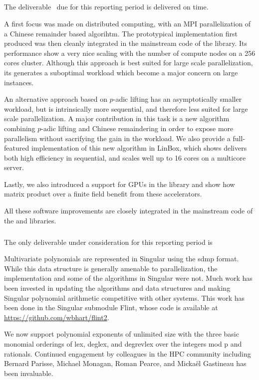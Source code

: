 \subparagraph{}
  \label{hpc@hpc-linbox}

The deliverable~ due for this reporting period is
delivered on time.

A first focus was made on distributed computing, with an MPI parallelization of a Chinese remainder based
algorihtm. The prototypical implementation first produced was then cleanly integrated in the mainstream code of the
library. Its performance show a very nice scaling with the number of compute nodes on a 256 cores cluster. Although this
approach is best suited for large scale parallelization, its generates a suboptimal workload which become a major
concern on large instances.

An alternative approach based on $p$-adic lifting has an  asymptotically smaller workload, but is intrinsically more
sequential, and therefore less suited for large scale parallelization. 
A major contribution in this task is a new algorithm combining $p$-adic lifting and Chinese remaindering in order to
expose more parallelism without sacrifying the gain in the workload.
We also provide a full-featured  implementation of this new algorithm in LinBox, which shows delivers both high
efficiency in sequential, and scales well up to 16 cores on a multicore server.

Lastly, we also introduced a support for GPUs in the \fflasffpack library and show how matrix product over a finite
field benefit from these accelerators.

All these software improvements are closely integrated in the mainstream code of the \fflasffpack and \LinBox libraries.

  \subparagraph{}
  \label{hpc@hpc-singular}

  The only deliverable under consideration for this reporting period
  is~

Multivariate polynomials are represented in Singular using the sdmp format. While this data structure is generally amenable to parallelization, the implementation and some of the algorithms in Singular were not. Much work has been invested in updating the algorithms and data structures and making Singular polynomial arithmetic competitive with other systems. This work has been done in the Singular submodule Flint, whose code is available at \url{https://github.com/wbhart/flint2}.

We now support polynomial exponents of unlimited size with the three basic monomial orderings of lex, deglex, and degrevlex over the integers mod p and rationals. Continued engagement by colleagues in the HPC community including Bernard Parisse, Michael Monagan, Roman Pearce, and Micka\"el Gastineau has been invaluable.

